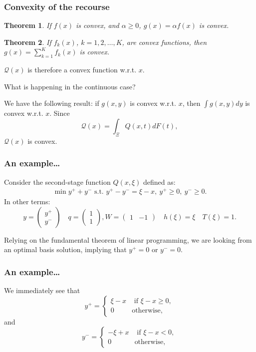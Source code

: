 \documentclass{beamer}
\newtheorem{theo}{Theorem}
\begin{document}
\begin{frame}
\frametitle{Convexity of the recourse}

\begin{theo}
If $f(x)$ is convex, and $\alpha \geq 0$, $g(x) = \alpha f(x)$ is convex.
\end{theo}

\begin{theo}
If $f_k(x)$, $k = 1,2,\ldots,K$, are convex functions, then $g(x) = \sum_{k=1}^K f_k(x)$ is convex.
\end{theo}

$\mathcal{Q}(x)$ is therefore a convex function w.r.t. $x$.

\mbox{}

What is happening in the continuous case?

\mbox{}

We have the following result: if $g(x,y)$ is convex w.r.t. $x$, then $\int g(x,y)dy$ is convex w.r.t. $x$. Since
\[
\mathcal{Q}(x) = \int_{\Xi} Q(x,t) dF(t),
\]
{\red $\mathcal{Q}(x)$ is convex}.

\end{frame}

\begin{frame}
\frametitle{An example\ldots}

Consider the second-stage function $Q(x,\xi)$ defined as:
\begin{align*}
\min y^++y^- \mbox{ s.t. } y^+-y^- = \xi - x,\ y^+ \geq 0,\ y^- \geq 0.
\end{align*}
In other terms:
\[
y = \begin{pmatrix} y^+ \\ y^- \end{pmatrix} \quad q = \begin{pmatrix}
    1 \\ 1 \end{pmatrix}, W = \begin{pmatrix} 1 & -1 \end{pmatrix}
  \quad h(\xi) = \xi \quad T(\xi) = 1.
\]

\mbox{}

Relying on the fundamental theorem of linear programming, we are looking from an optimal basis solution, implying that $y^+ = 0$ or $y^- = 0$.

\end{frame}

\begin{frame}
\frametitle{An example\ldots}

We immediately see that
$$
y^+ = \begin{cases}
	\xi - x & \text{ if } \xi - x \geq 0, \\
	0 & \text{otherwise,}
\end{cases}
$$
and
$$
y^- = \begin{cases}
	-\xi + x & \text{ if } \xi - x < 0, \\
	0 & \text{otherwise,}
\end{cases}
$$

\end{frame}
\end{document}
